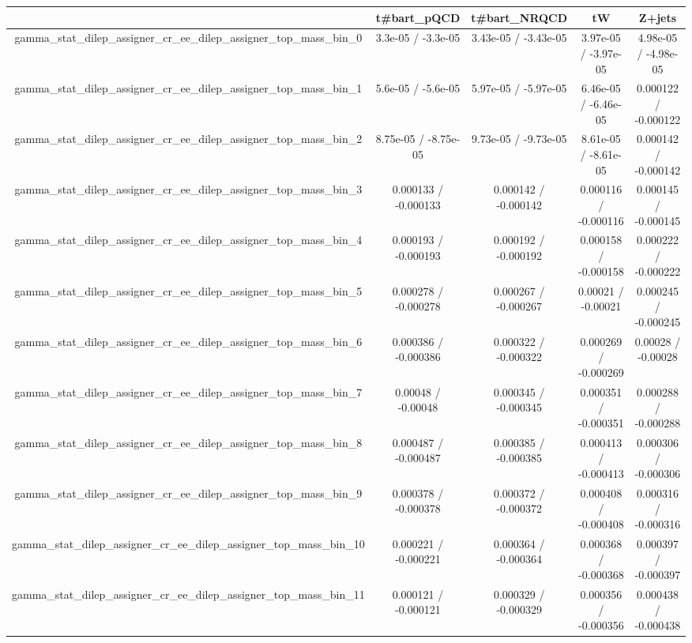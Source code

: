 \documentclass[10pt]{article}
\begin{document}
\begin{table}[htbp]
\begin{center}
\begin{tabular}{|c|c|c|c|c|}
\hline 
      & t#bar{t}_{pQCD}      & t#bar{t}_{NRQCD}      & tW      & Z+jets \\ 
\hline 
  gamma_stat_dilep_assigner_cr_ee_dilep_assigner_top_mass_bin_0 & 3.3e-05 / -3.3e-05 & 3.43e-05 / -3.43e-05 & 3.97e-05 / -3.97e-05 & 4.98e-05 / -4.98e-05 \\ 
  gamma_stat_dilep_assigner_cr_ee_dilep_assigner_top_mass_bin_1 & 5.6e-05 / -5.6e-05 & 5.97e-05 / -5.97e-05 & 6.46e-05 / -6.46e-05 & 0.000122 / -0.000122 \\ 
  gamma_stat_dilep_assigner_cr_ee_dilep_assigner_top_mass_bin_2 & 8.75e-05 / -8.75e-05 & 9.73e-05 / -9.73e-05 & 8.61e-05 / -8.61e-05 & 0.000142 / -0.000142 \\ 
  gamma_stat_dilep_assigner_cr_ee_dilep_assigner_top_mass_bin_3 & 0.000133 / -0.000133 & 0.000142 / -0.000142 & 0.000116 / -0.000116 & 0.000145 / -0.000145 \\ 
  gamma_stat_dilep_assigner_cr_ee_dilep_assigner_top_mass_bin_4 & 0.000193 / -0.000193 & 0.000192 / -0.000192 & 0.000158 / -0.000158 & 0.000222 / -0.000222 \\ 
  gamma_stat_dilep_assigner_cr_ee_dilep_assigner_top_mass_bin_5 & 0.000278 / -0.000278 & 0.000267 / -0.000267 & 0.00021 / -0.00021 & 0.000245 / -0.000245 \\ 
  gamma_stat_dilep_assigner_cr_ee_dilep_assigner_top_mass_bin_6 & 0.000386 / -0.000386 & 0.000322 / -0.000322 & 0.000269 / -0.000269 & 0.00028 / -0.00028 \\ 
  gamma_stat_dilep_assigner_cr_ee_dilep_assigner_top_mass_bin_7 & 0.00048 / -0.00048 & 0.000345 / -0.000345 & 0.000351 / -0.000351 & 0.000288 / -0.000288 \\ 
  gamma_stat_dilep_assigner_cr_ee_dilep_assigner_top_mass_bin_8 & 0.000487 / -0.000487 & 0.000385 / -0.000385 & 0.000413 / -0.000413 & 0.000306 / -0.000306 \\ 
  gamma_stat_dilep_assigner_cr_ee_dilep_assigner_top_mass_bin_9 & 0.000378 / -0.000378 & 0.000372 / -0.000372 & 0.000408 / -0.000408 & 0.000316 / -0.000316 \\ 
  gamma_stat_dilep_assigner_cr_ee_dilep_assigner_top_mass_bin_10 & 0.000221 / -0.000221 & 0.000364 / -0.000364 & 0.000368 / -0.000368 & 0.000397 / -0.000397 \\ 
  gamma_stat_dilep_assigner_cr_ee_dilep_assigner_top_mass_bin_11 & 0.000121 / -0.000121 & 0.000329 / -0.000329 & 0.000356 / -0.000356 & 0.000438 / -0.000438 \\ 

\end{tabular}
\end{center}
\end{table}
\end{document}

